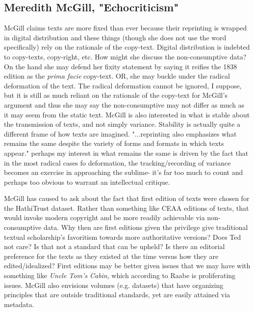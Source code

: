 \documentclass[course, english]{Notes}
\newcommand{\n}{\scalebox{2}{\textbf{\framebox{$\aleph$} } } }
\begin{document}
{\subsection{Meredith McGill, "Echocriticism"}
\begin{outline}
\1 McGill claims texts are more fixed than ever because their reprinting is wrapped in digital distribution and these things (though she does not use the word specifically) rely on the rationale of the copy-text. Digital distribution is indebted to copy-texts, copy-right, etc. 
	\2 \n How might she discuss the non-consumptive data? On the hand she may defend her fixity statement by saying it reifies the 1838 edition as the \textit{prima facie} copy-text.
	\2 \n OR, she may buckle under the radical deformation of the text. 
		\3 The radical deformation cannot be ignored, I suppose, but it is still as much reliant on the rationale of the copy-text for McGill's argument and thus she may say the non-consumptive may not differ as much as it may seem from the static text. 
\1 McGill is also interested in what is stable about the transmission of texts, and not simply variance. Stability is actually quite a different frame of how texts are imagined. 
	\2 "...reprinting also emphasizes what remains the same despite the variety of forms and formats in which texts appear."
		\3 \n perhaps my interest in what remains the same is driven by the fact that in the most radical cases fo deformation, the tracking/recording of variance becomes an exercise in approaching the sublime- it's far too much to count and perhaps too obvious to warrant an intellectual critique. 

\1 \n McGill has caused to ask about the fact that first edition of texts were chosen for the HathiTrust dataset. Rather than something like CEAA editions of texts, that would invoke modern copyright and be more readily achievable via non-consumptive data. Why then are first editions given the privilege give traditional textual scholarship's favoritism towards more authoritative versions? Does Ted not care? Is that not a standard that can be upheld? Is there an editorial preference for the texts as they existed at the time versus how they are edited/idealized? 
	\2 First editions may be better given issues that we may have with something like \textit{Uncle Tom's Cabin}, which according to Raabe is proliferating issues. 
	\2 McGill also envisions volumes (e.g. datasets) that have organizing principles that are outside traditional standards, yet are easily attained via metadata. 


\end{outline}}
\end{document}
